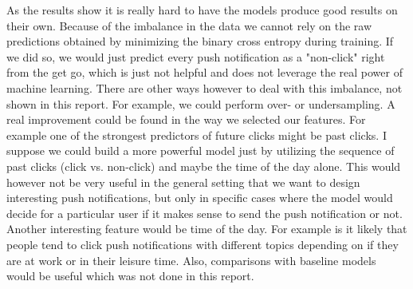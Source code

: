\documentclass[utf8x]{ctexart}
\begin{document}
As the results show it is really hard to have the models produce good results on their own. Because of the imbalance in the data we cannot rely on the raw predictions obtained by minimizing the binary cross entropy during training. If we did so, we would just predict every push notification as a "non-click" right from the get go, which is just not helpful and does not leverage the real power of machine learning. There are other ways however to deal with this imbalance, not shown in this report. For example, we could perform over- or undersampling.
A real improvement could be found in the way we selected our features.
For example one of the strongest predictors of future clicks might be past clicks. I suppose we could build a more powerful model just by utilizing the sequence of past clicks (click vs. non-click) and maybe the time of the day alone. This would however not be very useful in the general setting that we want to design interesting push notifications, but only in specific cases where the model would decide for a particular user if it makes sense to send the push notification or not.
Another interesting feature would be time of the day. For example is it likely that people tend to click push notifications with different topics depending on if they are at work or in their leisure time. Also, comparisons with baseline models would be useful which was not done in this report.

% 
% 
\end{document}
